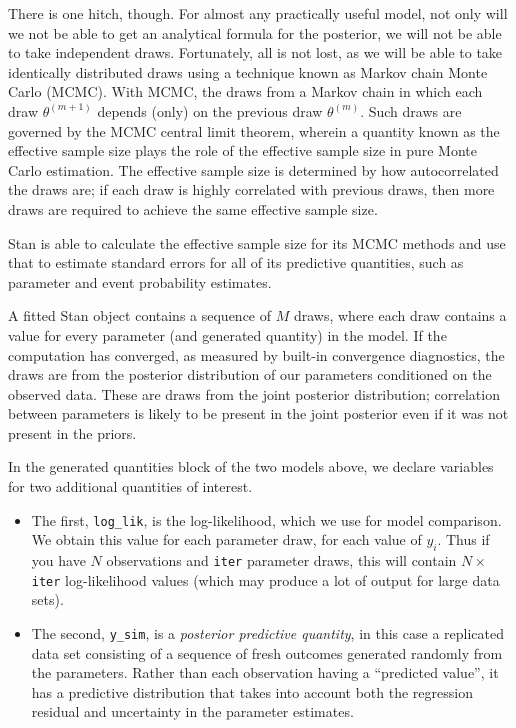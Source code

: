 \documentclass[]{book}
\begin{document}
There is one hitch, though. For almost any practically useful model, not
only will we not be able to get an analytical formula for the posterior,
we will not be able to take independent draws. Fortunately, all is not
lost, as we will be able to take identically distributed draws using a
technique known as Markov chain Monte Carlo (MCMC). With MCMC, the draws
from a Markov chain in which each draw \(\theta^{(m+1)}\) depends (only)
on the previous draw \(\theta^{(m)}\). Such draws are governed by the
MCMC central limit theorem, wherein a quantity known as the effective
sample size plays the role of the effective sample size in pure Monte
Carlo estimation. The effective sample size is determined by how
autocorrelated the draws are; if each draw is highly correlated with
previous draws, then more draws are required to achieve the same
effective sample size.

Stan is able to calculate the effective sample size for its MCMC methods
and use that to estimate standard errors for all of its predictive
quantities, such as parameter and event probability estimates.

A fitted Stan object contains a sequence of \(M\) draws, where each draw
contains a value for every parameter (and generated quantity) in the
model. If the computation has converged, as measured by built-in
convergence diagnostics, the draws are from the posterior distribution
of our parameters conditioned on the observed data. These are draws from
the joint posterior distribution; correlation between parameters is
likely to be present in the joint posterior even if it was not present
in the priors.

In the generated quantities block of the two models above, we declare
variables for two additional quantities of interest.

\begin{itemize}
\item
  The first, \texttt{log\_lik}, is the log-likelihood, which we use for
  model comparison. We obtain this value for each parameter draw, for
  each value of \(y_{i}\). Thus if you have \(N\) observations and
  \texttt{iter} parameter draws, this will contain \(N\times\)
  \texttt{iter} log-likelihood values (which may produce a lot of output
  for large data sets).
\item
  The second, \texttt{y\_sim}, is a \emph{posterior predictive
  quantity}, in this case a replicated data set consisting of a sequence
  of fresh outcomes generated randomly from the parameters. Rather than
  each observation having a ``predicted value'', it has a predictive
  distribution that takes into account both the regression residual and
  uncertainty in the parameter estimates.
\end{itemize}
\end{document}
